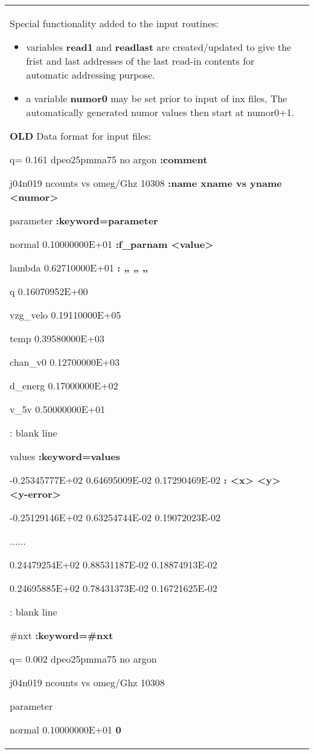 \documentclass[]{article}
\begin{document}
\begin{longtable}[]{@{}ll@{}}
\begin{minipage}[t]{0.47\columnwidth}
Special functionality added to the input routines:

\begin{itemize}
\item
  variables \textbf{read1} and \textbf{readlast} are created/updated to
  give the frist and last addresses of the last read-in contents for
  automatic addressing purpose.
\item
  a variable \textbf{numor0} may be set prior to input of inx files, The
  automatically generated numor values then start at numor0+1.
\end{itemize}

\textbf{OLD} Data format for input files:

q= 0.161 dpeo25pmma75 no argon \textbf{:comment}

j04n019 ncounts vs omeg/Ghz 10308 \textbf{:name xname vs yname
\textless{}numor\textgreater{}}

parameter \textbf{:keyword=parameter}

normal 0.10000000E+01 \textbf{:f\_parnam \textless{}value\textgreater{}}

lambda 0.62710000E+01 \textbf{: „ „ „}

q 0.16070952E+00

vzg\_velo 0.19110000E+05

temp 0.39580000E+03

chan\_v0 0.12700000E+03

d\_energ 0.17000000E+02

v\_5v 0.50000000E+01

: blank line

values \textbf{:keyword=values}

-0.25345777E+02 0.64695009E-02 0.17290469E-02 \textbf{:
\textless{}x\textgreater{} \textless{}y\textgreater{}
\textless{}y-error\textgreater{}}

-0.25129146E+02 0.63254744E-02 0.19072023E-02

......

0.24479254E+02 0.88531187E-02 0.18874913E-02

0.24695885E+02 0.78431373E-02 0.16721625E-02

: blank line

\#nxt \textbf{:keyword=\#nxt}

q= 0.002 dpeo25pmma75 no argon

j04n019 ncounts vs omeg/Ghz 10308

parameter

normal 0.10000000E+01 \textbf{0}


\end{minipage}
\end{longtable}
\end{document}

